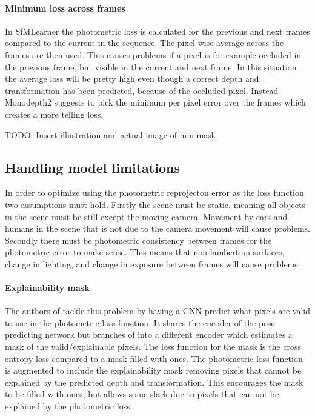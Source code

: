 \paragraph{Minimum loss across frames} In SfMLearner the photometric loss is calculated for the previous and next frames compared to the current in the sequence. The pixel wise average across the frames are then used. This causes problems if a pixel is for example occluded in the previous frame, but visible in the current and next frame. In this situation the average loss will be pretty high even though a correct depth and transformation has been predicted, because of the occluded pixel. Instead Monodepth2 suggests to pick the minimum per pixel error over the frames which creates a more telling loss. 

TODO: Insert illustration and actual image of min-mask.

\subsection{Handling model limitations}
\label{sec:modellimit}

In order to optimize using the photometric reprojecton error as the loss function two assumptions must hold. Firstly the scene must be static, meaning all objects in the scene must be still except the moving camera. Movement by cars and humans in the scene that is not due to the camera movement will cause problems. Secondly there must be photometric consistency between frames for the photometric error to make sense. This means that non lambertian surfaces, change in lighting, and change in exposure between frames will cause problems.

\paragraph{Explainability mask} The authors of \cite{sfmlearner} tackle this problem by having a CNN predict what pixels are valid to use in the photometric loss function. It shares the encoder of the pose predicting network but branches of into a different encoder which estimates a mask of the valid/explainable pixels. The loss function for the mask is the cross entropy loss compared to a mask filled with ones. The photometric loss function is augmented to include the explainability mask removing pixels that cannot be explained by the predicted depth and transformation. This encourages the mask to be filled with ones, but allows some slack due to pixels that can not be explained by the photometric loss.


